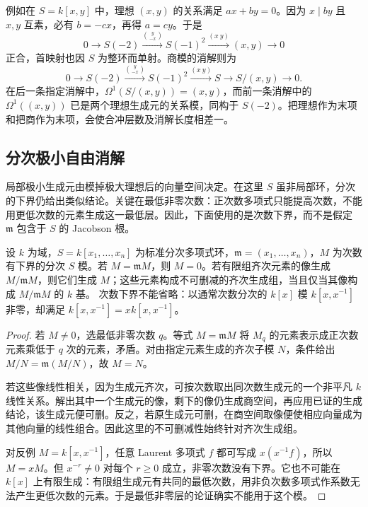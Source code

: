 \ProseParagraphBreak
例如在 \(S=k[x,y]\) 中，理想 \((x,y)\) 的关系满足 \(ax+by=0\)。因为 \(x\mid by\) 且 \(x,y\) 互素，必有 \(b=-cx\)，再得 \(a=cy\)。于是
\[
	0\longrightarrow S(-2)\xrightarrow{\binom{y}{-x}}S(-1)^2 \xrightarrow{(x\ y)}(x,y)\longrightarrow0
\]
正合，首映射也因 \(S\) 为整环而单射。商模的消解则为
\[
	0\longrightarrow S(-2)\xrightarrow{\binom{y}{-x}}S(-1)^2 \xrightarrow{(x\ y)}S\longrightarrow S/(x,y)\longrightarrow0.
\]
在后一条指定消解中，\(\Omega^1(S/(x,y))=(x,y)\)，而前一条消解中的 \(\Omega^1((x,y))\) 已是两个理想生成元的关系模，同构于 \(S(-2)\)。把理想作为末项和把商作为末项，会使合冲层数及消解长度相差一。

\subsection{分次极小自由消解}
\label{b3:subsec:2101:02}

局部极小生成元由模掉极大理想后的向量空间决定。在这里 \(S\) 虽非局部环，分次的下界仍给出类似结论。关键在最低非零次数：正次数多项式只能提高次数，不能用更低次数的元素生成这一最低层。因此，下面使用的是次数下界，而不是假定 \(\mathfrak m\) 包含于 \(S\) 的 Jacobson 根。

\begin{lemma}\label{b3:lem:graded-nakayama}
	设 \(k\) 为域，\(S=k[x_1,\ldots,x_n]\) 为标准分次多项式环，\(\mathfrak m=(x_1,\ldots,x_n)\)，\(M\) 为次数有下界的分次 \(S\) 模。若 \(M=\mathfrak mM\)，则 \(M=0\)。若有限组齐次元素的像生成 \(M/\mathfrak mM\)，则它们生成 \(M\)；这些元素构成不可删减的齐次生成组，当且仅当其像构成 \(M/\mathfrak mM\) 的 \(k\) 基。 次数下界不能省略：以通常次数分次的 \(k[x]\) 模 \(k[x,x^{-1}]\) 非零，却满足 \(k[x,x^{-1}]=xk[x,x^{-1}]\)。
\end{lemma}
\begin{proof}
	若 \(M\ne0\)，选最低非零次数 \(q\)。等式 \(M=\mathfrak mM\) 将 \(M_q\) 的元素表示成正次数元素乘低于 \(q\) 次的元素，矛盾。对由指定元素生成的齐次子模 \(N\)，条件给出 \(M/N=\mathfrak m(M/N)\)，故 \(M=N\)。

	若这些像线性相关，因为生成元齐次，可按次数取出同次数生成元的一个非平凡 \(k\) 线性关系。解出其中一个生成元的像，剩下的像仍生成商空间，再应用已证的生成结论，该生成元便可删。反之，若原生成元可删，在商空间取像便使相应向量成为其他向量的线性组合。因此这里的不可删减性始终针对齐次生成组。

	对反例 \(M=k[x,x^{-1}]\)，任意 Laurent 多项式 \(f\) 都可写成 \(x(x^{-1}f)\)，所以 \(M=xM\)。但 \(x^{-r}\ne0\) 对每个 \(r\ge0\) 成立，非零次数没有下界。它也不可能在 \(k[x]\) 上有限生成：有限组生成元有共同的最低次数，用非负次数多项式作系数无法产生更低次数的元素。于是最低非零层的论证确实不能用于这个模。
\end{proof}

